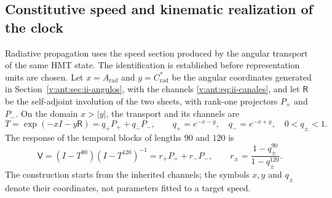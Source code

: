 \subsection{Constitutive speed and kinematic realization of the clock}
\label{v:sec:enlace-velocidad-constitutiva}

Radiative propagation uses the speed section produced by the
angular transport of the same HMT state. The identification is established
before representation units are chosen. Let $x=A_{\mathrm{rad}}$ and
$y=C^*_{\mathrm{rad}}$ be the angular coordinates generated in
Section~\ref{v:ant:sec:ii-angulos}, with the channels
\eqref{v:ant:eq:ii-canales}, and let
$\mathsf R$ be the self-adjoint involution of the two sheets, with rank-one
projectors $P_+$ and $P_-$. On the domain $x>|y|$, the transport and its
channels are
\begin{equation}
 T=\exp(-xI-y\mathsf R)=q_+P_++q_-P_-,
 \qquad q_+=e^{-x-y},\quad q_-=e^{-x+y},\quad 0<q_\pm<1.
 \label{v:eq:velocidad-transporte}
\end{equation}
The response of the temporal blocks of lengths $90$ and $120$ is
\begin{equation}
 \mathsf V=(I-T^{90})(I-T^{120})^{-1}
       =r_+P_++r_-P_-,\qquad
 r_\pm=\frac{1-q_\pm^{90}}{1-q_\pm^{120}}.
 \label{v:eq:velocidad-respuesta}
\end{equation}
The construction starts from the inherited channels; the symbols $x,y$ and
$q_\pm$ denote their coordinates, not parameters fitted to a target
speed.

